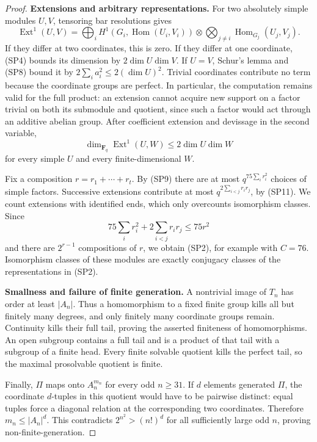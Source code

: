 \begin{proof}
\par\smallskip\noindent\textbf{Extensions and arbitrary representations.}\quad
For two absolutely simple modules \(U,V\), tensoring bar resolutions
gives
\[
 \operatorname{Ext}^1(U,V)=
 \bigoplus_i H^1(G_i,\operatorname{Hom}(U_i,V_i))
 \otimes\!\!\bigotimes_{j\ne i}\operatorname{Hom}_{G_j}(U_j,V_j).
 \tag{SP10}
\]
If they differ at two coordinates, this is zero.  If they differ
at one coordinate, (SP4) bounds its dimension by
\(2\dim U\dim V\).  If \(U=V\), Schur's lemma and (SP8)
bound it by \(2\sum_i a_i^2\leq2(\dim U)^2\).
Trivial coordinates contribute no term because the coordinate
groups are perfect.  In particular, the computation remains valid
for the full product: an extension cannot acquire new support
on a factor trivial on both its submodule and quotient, since
such a factor would act through an additive abelian group.
After coefficient extension and devissage in the second variable,
\[
 \dim_{\mathbf F_q}\operatorname{Ext}^1(U,W)
 \leq2\dim U\dim W
 \tag{SP11}
\]
for every simple \(U\) and every finite-dimensional \(W\).

Fix a composition \(r=r_1+\cdots+r_t\).  By (SP9) there are at
most \(q^{75\sum_i r_i^2}\) choices of simple factors.  Successive
extensions contribute at most \(q^{2\sum_{i<j}r_ir_j}\), by (SP11).
We count extensions with identified ends, which only overcounts
isomorphism classes.  Since
\[
 75\sum_i r_i^2+2\sum_{i<j}r_ir_j\leq75r^2
\]
and there are \(2^{r-1}\) compositions of \(r\), we obtain (SP2),
for example with \(C=76\).  Isomorphism classes of these modules
are exactly conjugacy classes of the representations in (SP2).

\par\smallskip\noindent\textbf{Smallness and failure of finite generation.}\quad
A nontrivial image of \(T_n\) has order at least \(|A_n|\).
Thus a homomorphism to a fixed finite group kills all but finitely
many degrees, and only finitely many coordinate groups remain.
Continuity kills their full tail, proving the asserted finiteness
of homomorphisms.  An open subgroup contains a full tail and is
a product of that tail with a subgroup of a finite head.
Every finite solvable quotient kills the perfect tail, so the
maximal prosolvable quotient is finite.

Finally, \(\Pi\) maps onto \(A_n^{m_n}\) for every odd \(n\geq31\).
If \(d\) elements generated \(\Pi\), the coordinate \(d\)-tuples
in this quotient would have to be pairwise distinct: equal
tuples force a diagonal relation at the corresponding two
coordinates.  Therefore \(m_n\leq|A_n|^d\).
This contradicts \(2^{n^2}>(n!)^d\) for all sufficiently large
odd \(n\), proving non-finite-generation.
\end{proof}

